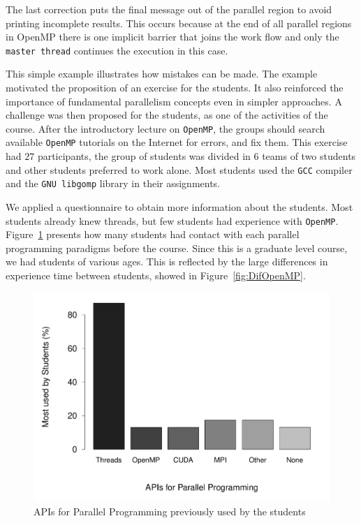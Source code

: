 The last correction puts the final message out of the parallel region to avoid printing incomplete results. This occurs because at the end of all parallel regions in OpenMP there is one implicit barrier that joins the work flow and only the \texttt{master thread} continues the execution in this case.


This simple example illustrates how mistakes can be made. The example motivated the proposition of an exercise for the students. It also reinforced the importance of fundamental parallelism concepts even in simpler approaches. A challenge was then proposed for the students, as one of the activities of the course. 
After the introductory lecture on \texttt{OpenMP}, the groups should search available \texttt{OpenMP} tutorials on the Internet for errors, and fix them. This exercise had $27$ participants, the group of students was divided in $6$ teams of two students and other students preferred to work alone. Most students used the \texttt{GCC} compiler and the \texttt{GNU libgomp} library in their assignments.

We applied a questionnaire to obtain more information about the students. Most students already knew threads, but few students had experience with \texttt{OpenMP}. Figure~\ref{fig:students:experience} presents how many students had contact with each parallel programming paradigms before the course. Since this is a graduate level course, we had students of various ages. This is reflected by the large differences in experience time between students, showed in Figure~\ref{fig:DifOpenMP}.

\begin{figure}[htpb]
\centering
\includegraphics[width=1.0\columnwidth,height=0.70\columnwidth, trim={0 1.0cm 0 1.5cm},clip]{figures/experiencePP.pdf}
\caption{APIs for Parallel Programming previously used by the students}
\label{fig:students:experience}
\end{figure}

